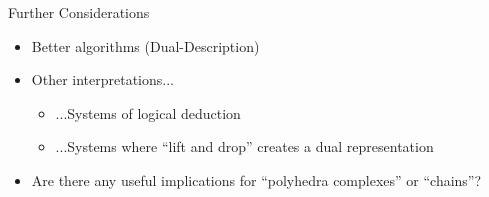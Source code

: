 \documentclass{beamer}
\begin{document}
\begin{frame}{Further Considerations}
\begin{itemize}
  \item Better algorithms (Dual-Description)
  \item Other interpretations...
  \begin{itemize}
    \item ...Systems of logical deduction
    \item ...Systems where ``lift and drop'' creates a dual representation
  \end{itemize}
  \item Are there any useful implications for ``polyhedra complexes'' or ``chains''?
\end{itemize}
\end{frame}



%
%
%
%
%
%
%
%
\end{document}
